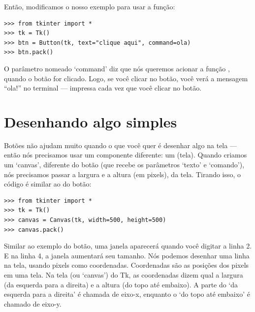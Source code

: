 \noindent
Então, modificamos o nosso exemplo para usar a função:

\begin{listing}
\begin{verbatim}
>>> from tkinter import *
>>> tk = Tk()
>>> btn = Button(tk, text="clique aqui", command=ola)
>>> btn.pack()
\end{verbatim}
\end{listing}

O parâmetro nomeado `command' diz que nós queremos acionar a função , quando o botão for clicado. Logo, se você clicar no botão, você verá a mensagem ``ola!'' no terminal --- impressa cada vez que você clicar no botão.

\section{Desenhando algo simples}

Botões não ajudam muito quando o que você quer é desenhar algo na tela --- então nós precisamos usar um componente diferente: um  (tela). Quando criamos um `canvas', diferente do botão (que recebe os parâmetros `texto' e `comando'), nós precisamos passar a largura e a altura (em pixels), da tela. Tirando isso, o código é similar ao do botão:

\begin{listing}
\begin{verbatim}
>>> from tkinter import *
>>> tk = Tk()
>>> canvas = Canvas(tk, width=500, height=500)
>>> canvas.pack()
\end{verbatim}
\end{listing}

Similar ao exemplo do botão, uma janela aparecerá quando você digitar a linha 2. E na linha 4, a janela aumentará seu tamanho. Nós podemos desenhar uma linha na tela, usando pixels como coordenadas. Coordenadas são as posições dos pixels em uma tela. Na tela (ou `canvas') do Tk, as coordenadas dizem qual a largura (da esquerda para a direita) e a altura (do topo até embaixo). A parte do `da esquerda para a direita' é chamada de eixo-x, enquanto o `do topo até embaixo' é chamado de eixo-y.


